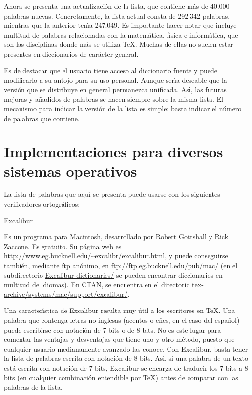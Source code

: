 \documentclass[a4paper,12pt]{article}
\begin{document}
Ahora se presenta una actualizaci\'on de la lista, que contiene m\'as de 40.000
palabras nuevas. Concretamente, la lista actual consta de 292.342 palabras,
mientras que la anterior ten\'{\i}a 247.049. Es importante hacer notar que
incluye multitud de palabras relacionadas con la matem\'atica, f\'{\i}sica e
inform\'atica, que son las disciplinas donde m\'as se utiliza \TeX. Muchas de
ellas no suelen estar presentes en diccionarios de car\'acter general.

Es de destacar que el usuario tiene acceso al diccionario fuente y puede
modificarlo a su antojo para su uso personal. Aunque ser\'{\i}a deseable que la
versi\'on que se distribuye en general permanezca unificada. As\'{\i}, las
futuras mejoras y a\~nadidos de palabras se hacen siempre sobre la misma lista.
El mecanismo para indicar la versi\'on de la lista es simple: basta indicar el
n\'umero de palabras que contiene.

\section{Implementaciones para diversos sistemas operativos}

La lista de palabras que aqu\'{\i} se presenta puede usarse con los siguientes
verificadores ortogr\'aficos:

\begin{subsection}{Excalibur}

Es un programa para Macintosh, desarrollado por Robert Gottshall y Rick Zaccone.
Es gratuito. Su p\'agina web es
\url{http://www.eg.bucknell.edu/~excalibr/excalibur.html}, y puede conseguirse
tambi\'en, mediante ftp an\'onimo, en \url{ftp://ftp.eg.bucknell.edu/pub/mac/}
(en el subdirectorio \url{Excalibur-dictionaries/} se pueden encontrar
diccionarios en multitud de idiomas). En CTAN, se encuentra en el directorio
\url{tex-archive/systems/mac/support/excalibur/}.

Una caracter\'{\i}stica de Excalibur resulta muy \'util a los escritores en
\TeX. Una palabra que contenga letras no inglesas (acentos o e\~nes, en el caso
del espa\~nol) puede escribirse con notaci\'on de 7 bits o de 8 bits. No es este
lugar para comentar las ventajas y desventajas que tiene uno y otro m\'etodo,
puesto que cualquier usuario medianamente avanzado las conoce. Con Excalibur,
basta tener la lista de palabras escrita con notaci\'on de 8 bits.
As\'{\i}, si una palabra de un texto est\'a escrita con notaci\'on de 7 bits,
Excalibur se encarga de traducir los 7 bits a 8 bits (en cualquier
combinaci\'on entendible por \TeX) antes de comparar con las palabras de la
lista.

\end{subsection}
\end{document}
